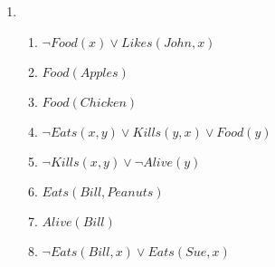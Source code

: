 \documentclass[]{article}
\begin{document}
\begin{enumerate}
\begin{enumerate}
\item \begin{enumerate}
\item $\neg Food(x) \lor Likes(John, x)$
\item $Food(Apples)$
\item $Food(Chicken)$
\item $\neg Eats(x,y) \lor Kills(y,x) \lor Food(y)$
\item $\neg Kills(x,y) \lor \neg Alive(y)$
\item $Eats(Bill, Peanuts)$
\item $Alive(Bill)$
\item $\neg Eats(Bill, x) \lor Eats(Sue, x)$
\end{enumerate}
\end{enumerate}
\end{enumerate}
\end{document}
